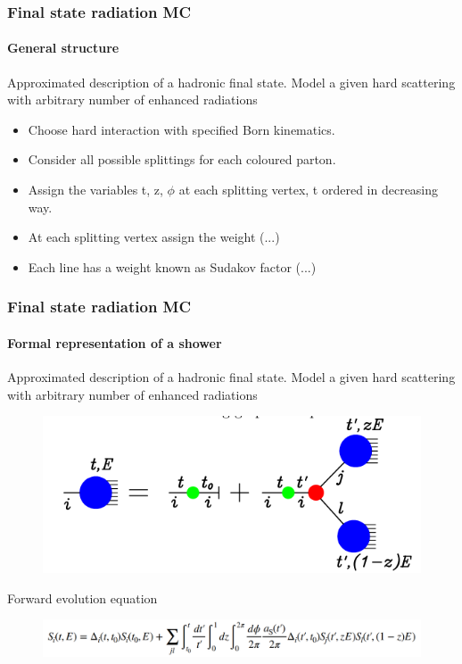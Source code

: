 \documentclass[aspectratio=43]{beamer}
\begin{document}
\begin{frame}

	\frametitle{Final state radiation MC}
	\framesubtitle{General structure}
	
	\footnotesize Approximated description of a hadronic final state. Model a given hard scattering with arbitrary number of enhanced radiations

	\begin{itemize} 
		\item Choose hard interaction with specified Born kinematics.
		\item Consider all possible splittings for each coloured parton.
		\item Assign the variables t, z, $\phi$ at each splitting vertex, t ordered in decreasing way.
		\item At each splitting vertex assign the weight (...)
		\item Each line has a weight known as Sudakov factor (...)
	\end{itemize}

\end{frame}

\begin{frame}

	\frametitle{Final state radiation MC}
	\framesubtitle{Formal representation of a shower}
	
	Approximated description of a hadronic final state. Model a given hard scattering with arbitrary number of enhanced radiations
	
	\begin{figure}
		\includegraphics[width = 6 cm]{plots/shower_2.png}
	\end{figure}
		
	Forward evolution equation
	\begin{figure}
		\includegraphics[width = 10 cm]{plots/shower_0.png}
	\end{figure}

\end{frame}
\end{document}
